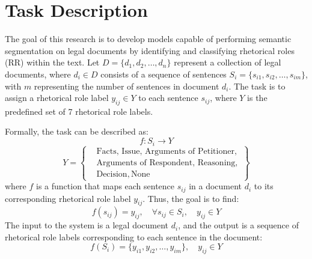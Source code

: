 \section{Task Description}
The goal of this research is to develop models capable of performing semantic segmentation on legal documents by identifying and classifying rhetorical roles (RR) within the text. Let \( D = \{d_1, d_2, \dots, d_n\} \) represent a collection of legal documents, where \( d_i \in D \) consists of a sequence of sentences \( S_i = \{s_{i1}, s_{i2}, \dots, s_{im}\} \), with \( m \) representing the number of sentences in document \( d_i \). The task is to assign a rhetorical role label \( y_{ij} \in Y \) to each sentence \( s_{ij} \), where $Y$ is the predefined set of 7 rhetorical role labels.

Formally, the task can be described as:
\[
f: S_i \rightarrow Y
\]
\[
Y = \left\{
\begin{aligned}
&\text{Facts}, \, \text{Issue}, \, \text{Arguments of Petitioner}, \\
&\text{Arguments of Respondent}, \, \text{Reasoning},  \\
&\text{Decision}, \, \text{None}
\end{aligned}
\right\}
\]
where \( f \) is a function that maps each sentence \( s_{ij} \) in a document \( d_i \) to its corresponding rhetorical role label \( y_{ij} \). Thus, the goal is to find:
\[
f(s_{ij}) = y_{ij}, \quad \forall s_{ij} \in S_i, \quad y_{ij} \in Y
\]
The input to the system is a legal document \( d_i \), and the output is a sequence of rhetorical role labels corresponding to each sentence in the document:
\[
f(S_i) = \{y_{i1}, y_{i2}, \dots, y_{im}\}, \quad y_{ij} \in Y
\]




